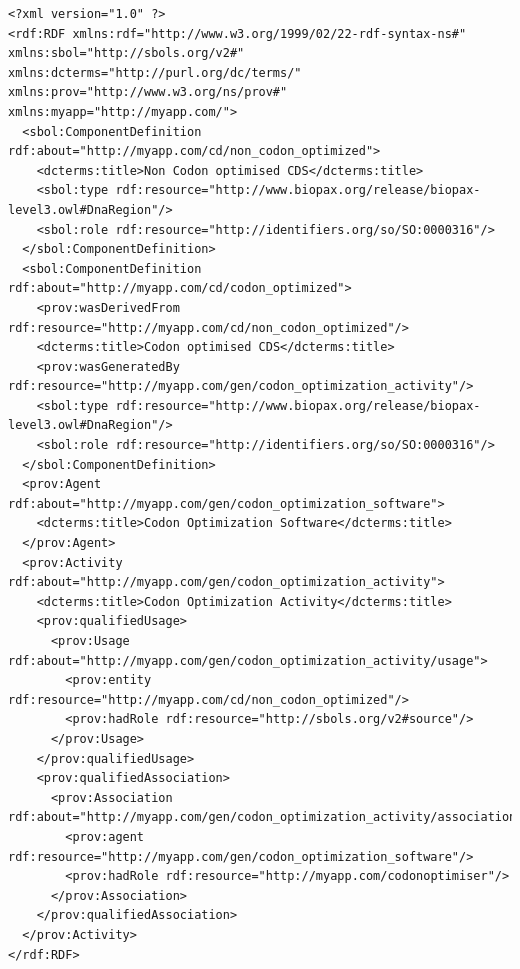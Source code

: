 \begin{lstlisting}
<?xml version="1.0" ?>
<rdf:RDF xmlns:rdf="http://www.w3.org/1999/02/22-rdf-syntax-ns#" xmlns:sbol="http://sbols.org/v2#" 
xmlns:dcterms="http://purl.org/dc/terms/" xmlns:prov="http://www.w3.org/ns/prov#" xmlns:myapp="http://myapp.com/">
  <sbol:ComponentDefinition rdf:about="http://myapp.com/cd/non_codon_optimized">
    <dcterms:title>Non Codon optimised CDS</dcterms:title>
    <sbol:type rdf:resource="http://www.biopax.org/release/biopax-level3.owl#DnaRegion"/>
    <sbol:role rdf:resource="http://identifiers.org/so/SO:0000316"/>
  </sbol:ComponentDefinition>
  <sbol:ComponentDefinition rdf:about="http://myapp.com/cd/codon_optimized">
    <prov:wasDerivedFrom rdf:resource="http://myapp.com/cd/non_codon_optimized"/>
    <dcterms:title>Codon optimised CDS</dcterms:title>
    <prov:wasGeneratedBy rdf:resource="http://myapp.com/gen/codon_optimization_activity"/>
    <sbol:type rdf:resource="http://www.biopax.org/release/biopax-level3.owl#DnaRegion"/>
    <sbol:role rdf:resource="http://identifiers.org/so/SO:0000316"/>
  </sbol:ComponentDefinition>
  <prov:Agent rdf:about="http://myapp.com/gen/codon_optimization_software">
    <dcterms:title>Codon Optimization Software</dcterms:title>
  </prov:Agent>
  <prov:Activity rdf:about="http://myapp.com/gen/codon_optimization_activity">
    <dcterms:title>Codon Optimization Activity</dcterms:title>
    <prov:qualifiedUsage>
      <prov:Usage rdf:about="http://myapp.com/gen/codon_optimization_activity/usage">
        <prov:entity rdf:resource="http://myapp.com/cd/non_codon_optimized"/>
        <prov:hadRole rdf:resource="http://sbols.org/v2#source"/>
      </prov:Usage>
    </prov:qualifiedUsage>
    <prov:qualifiedAssociation>
      <prov:Association rdf:about="http://myapp.com/gen/codon_optimization_activity/association">
        <prov:agent rdf:resource="http://myapp.com/gen/codon_optimization_software"/>
        <prov:hadRole rdf:resource="http://myapp.com/codonoptimiser"/>
      </prov:Association>
    </prov:qualifiedAssociation>
  </prov:Activity>
</rdf:RDF>
\end{lstlisting}





